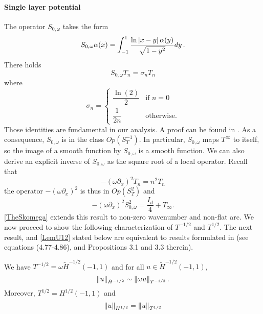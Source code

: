 \documentclass[a4paper]{article}
\begin{document}
\paragraph{Single layer potential} The operator $S_{0,\omega}$ takes the form 
\[S_{0,\omega} \alpha(x) = \int_{-1}^{1} \frac{\ln \left\lvert x - y \right\rvert \alpha(y)}{\sqrt{1 - y^2}}dy \,.\]
There holds 
\begin{equation}
	\label{explicitEigs}
	S_{0,\omega} T_n = \sigma_n T_n
\end{equation}
where 
\[\sigma_n = \begin{cases}
\dfrac{\ln(2)}{2} & \text{if } n=0\\
\dfrac{1}{2n} & \text{otherwise}.
\end{cases}\]
Those identities are fundamental in our analysis. A proof can be found in \cite{} . As a consequence, $S_{0,\omega}$ is in the class $\textit{Op}(S^{-1}_T)$. In particular, $S_{0,\omega}$ maps $T^{\infty}$ to itself, so the image of a smooth function by $S_{0,\omega}$ is a smooth function. We can also derive an explicit inverse of $S_{0,\omega}$ as the square root of a local operator. Recall that
\[-(\omega \partial_x)^2 T_n = n^2 T_n\]
the operator $-(\omega \partial_x)^2$ is thus in $\textit{Op}(S^{2}_T)$ and 
\begin{equation}
\label{prelude1}
	-(\omega \partial_x)^2 S_{0,\omega}^2 = \frac{I_d}{4} + T_\infty.
\end{equation}
\autoref{TheSkomega} extends this result to non-zero wavenumber and non-flat arc. 
We now proceed to show the following characterization of $T^{-1/2}$ and $T^{1/2}$. The next result, and \autoref{LemU12} stated below are equivalent to results formulated in \cite{jerez2012explicit} (see equations (4.77-4.86), and Propositions 3.1 and 3.3 therein).
\begin{Lem}
	\label{LemmaT-1/2}
	We have $T^{-1/2} = \omega\tilde{H}^{-1/2}(-1,1)$ and for all $u \in \tilde{H}^{-1/2}(-1,1)$,
	\[\left\|u\right\|_{\tilde{H}^{-1/2}} \sim \left\|\omega u\right\|_{T^{-1/2}}.\] 
	Moreover, $T^{1/2} = H^{1/2}(-1,1)$ and 
	\[\left\|u\right\|_{H^{1/2}} = \left\|u\right\|_{T^{1/2}}\]
\end{Lem}
\end{document}
